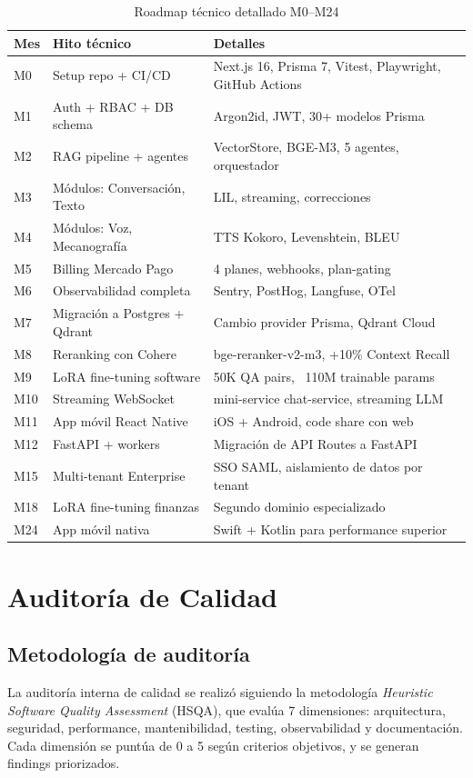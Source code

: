 \documentclass[10pt,a4paper,oneside]{report}
\begin{document}
\begin{table}[H]
\centering
\begin{tabular}{p{1.5cm}p{4cm}p{7cm}}
\toprule
\textbf{Mes} & \textbf{Hito técnico} & \textbf{Detalles} \\
\midrule
M0 & Setup repo + CI/CD & Next.js 16, Prisma 7, Vitest, Playwright, GitHub Actions \\
M1 & Auth + RBAC + DB schema & Argon2id, JWT, 30+ modelos Prisma \\
M2 & RAG pipeline + agentes & VectorStore, BGE-M3, 5 agentes, orquestador \\
M3 & Módulos: Conversación, Texto & LIL, streaming, correcciones \\
M4 & Módulos: Voz, Mecanografía & TTS Kokoro, Levenshtein, BLEU \\
M5 & Billing Mercado Pago & 4 planes, webhooks, plan-gating \\
M6 & Observabilidad completa & Sentry, PostHog, Langfuse, OTel \\
M7 & Migración a Postgres + Qdrant & Cambio provider Prisma, Qdrant Cloud \\
M8 & Reranking con Cohere & bge-reranker-v2-m3, +10\% Context Recall \\
M9 & LoRA fine-tuning software & 50K QA pairs, ~110M trainable params \\
M10 & Streaming WebSocket & mini-service chat-service, streaming LLM \\
M11 & App móvil React Native & iOS + Android, code share con web \\
M12 & FastAPI + workers & Migración de API Routes a FastAPI \\
M15 & Multi-tenant Enterprise & SSO SAML, aislamiento de datos por tenant \\
M18 & LoRA fine-tuning finanzas & Segundo dominio especializado \\
M24 & App móvil nativa & Swift + Kotlin para performance superior \\
\bottomrule
\end{tabular}
\caption{Roadmap técnico detallado M0--M24}
\end{table}

\chapter{Auditoría de Calidad}

\section{Metodología de auditoría}
La auditoría interna de calidad se realizó siguiendo la metodología \textit{Heuristic Software Quality Assessment} (HSQA), que evalúa 7 dimensiones: arquitectura, seguridad, performance, mantenibilidad, testing, observabilidad y documentación. Cada dimensión se puntúa de 0 a 5 según criterios objetivos, y se generan findings priorizados.
\end{document}
